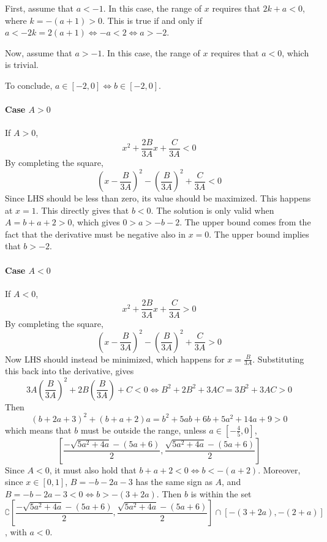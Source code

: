 \documentclass[a4paper, 11pt]{scrartcl}
\begin{document}
First, assume that $a < -1$. In this case, the range of $x$ requires that $2k + a < 0$, where $k = -(a + 1) > 0$. This is true if and only if $a < -2k = 2(a + 1) \iff -a < 2 \iff a > -2$.

Now, assume that $a > -1$. In this case, the range of $x$ requires that $a < 0$, which is trivial.

To conclude, $a\in[-2, 0] \iff b\in[-2, 0]$.


\paragraph{Case $A>0$}
If $A>0$,
\[
x^2 +\frac{2B}{3A}x + \frac{C}{3A} < 0
\]
By completing the square,
\[
 \left(x - \frac{B}{3A}\right)^2 - \left(\frac{B}{3A}\right)^2 + \frac{C}{3A} < 0
\]
Since LHS should be less than zero, its value should be maximized. This happens at $x = 1$. This directly gives that $b < 0$. The solution is only valid when $A = b+a+2 > 0$, which gives $0 > a > -b - 2$. The upper bound comes from the fact that the derivative must be negative also in $x = 0$. The upper bound implies that $b > -2$.

\paragraph{Case $A < 0$} If $A < 0$,
\[
x^2 +\frac{2B}{3A}x + \frac{C}{3A} > 0
\]
By completing the square,
\[
 \left(x - \frac{B}{3A}\right)^2 - \left(\frac{B}{3A}\right)^2 + \frac{C}{3A} > 0
\]
Now LHS should instead be minimized, which happens for $x = \frac{B}{3A}$. Substituting this back into the derivative, gives
\[
 3A\left(\frac{B}{3A}\right)^2 + 2B\left(\frac{B}{3A}\right) + C < 0 \iff B^2 + 2B^2 + 3AC = 3B^2 + 3AC > 0
\]
Then
\[
(b+2a+3)^2 + (b+a+2)a = {{b}^{2}}+ 5 ab + 6b + 5 {{a}^{2}}+14 a+9 > 0
\]
which means that $b$ must be outside the range, unless $a\in[-\frac{4}{5}, 0]$,
\[
 \left[\frac{-\sqrt{5 {{a}^{2}}+4 a}-(5a+6)}{2}, \frac{\sqrt{5 {{a}^{2}}+4 a}-(5a+6)}{2}\right]
\]
Since $A < 0$, it must also hold that $b+a+2 < 0 \iff b < -(a + 2)$. Moreover, since $x\in[0, 1]$, $B = -b-2a-3$ has the same sign as $A$, and $B=-b-2a-3 < 0 \iff b > -(3 + 2a)$. Then $b$ is within the set
\[
 \complement\left[\frac{-\sqrt{5 {{a}^{2}}+4 a}-(5a+6)}{2}, \frac{\sqrt{5 {{a}^{2}}+4 a}-(5a+6)}{2}\right] \cap \left[-(3 + 2a), -(2 + a)\right]
\], with $a < 0$.
\end{document}
